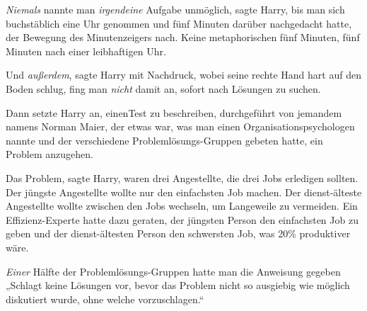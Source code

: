 \emph{Niemals} nannte man \emph{irgendeine} Aufgabe unmöglich, sagte Harry, bis man sich buchstäblich eine Uhr genommen und fünf Minuten darüber nachgedacht hatte, der Bewegung des Minutenzeigers nach. Keine metaphorischen fünf Minuten, fünf Minuten nach einer leibhaftigen Uhr.

Und \emph{außerdem}, sagte Harry mit Nachdruck, wobei seine rechte Hand hart auf den Boden schlug, fing man \emph{nicht} damit an, sofort nach Lösungen zu suchen.

Dann setzte Harry an, einenTest zu beschreiben, durchgeführt von jemandem namens Norman Maier, der etwas war, was man einen Organisationspsychologen nannte und der verschiedene Problemlösungs-Gruppen gebeten hatte, ein Problem anzugehen.

Das Problem, sagte Harry, waren drei Angestellte, die drei Jobs erledigen sollten. Der jüngste Angestellte wollte nur den einfachsten Job machen. Der dienst-älteste Angestellte wollte zwischen den Jobs wechseln, um Langeweile zu vermeiden. Ein Effizienz-Experte hatte dazu geraten, der jüngsten Person den einfachsten Job zu geben und der dienst-ältesten Person den schwersten Job, was 20\% produktiver wäre.

\emph{Einer} Hälfte der Problemlösungs-Gruppen hatte man die Anweisung gegeben „Schlagt keine Lösungen vor, bevor das Problem nicht so ausgiebig wie möglich diskutiert wurde, ohne welche vorzuschlagen.“

